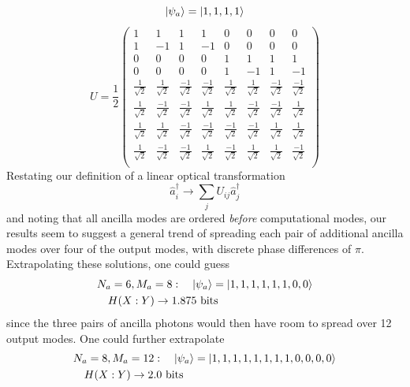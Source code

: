 \documentclass[aps,pra,twocolumn,showpacs,superscriptaddress,floatfix,10pt]{revtex4}
\begin{document}
		\newline
		$$ \ket{\psi_a} = \ket{1,1,1,1} $$
		\newline
		\begin{equation}
		\label{1111 Ancilla}
		U = \frac{1}{2} \begin{pmatrix} 
		1 & 1 & 1 & 1 & 0 & 0 & 0 & 0 \\ 
		1 & -1 & 1 & -1 & 0 & 0 & 0 & 0 \\ 
		0 & 0 & 0 & 0 & 1 & 1 & 1 & 1 \\
		0 & 0 & 0 & 0 & 1 & -1 & 1 & -1 \\
		\frac{1}{\sqrt 2} & \frac{1}{\sqrt 2} & \frac{-1}{\sqrt 2} & \frac{-1}{\sqrt 2} & \frac{1}{\sqrt 2} & \frac{1}{\sqrt 2} & \frac{-1}{\sqrt 2} & \frac{-1}{\sqrt 2} \\ 
		\frac{1}{\sqrt 2} & \frac{-1}{\sqrt 2} & \frac{-1}{\sqrt 2} & \frac{1}{\sqrt 2} & \frac{1}{\sqrt 2} & \frac{-1}{\sqrt 2} & \frac{-1}{\sqrt 2} & \frac{1}{\sqrt 2} \\ 
		\frac{1}{\sqrt 2} & \frac{1}{\sqrt 2} & \frac{-1}{\sqrt 2} & \frac{-1}{\sqrt 2} & \frac{-1}{\sqrt 2} & \frac{-1}{\sqrt 2} & \frac{1}{\sqrt 2} & \frac{1}{\sqrt 2} \\ 
		\frac{1}{\sqrt 2} & \frac{-1}{\sqrt 2} & \frac{-1}{\sqrt 2} & \frac{1}{\sqrt 2} & \frac{-1}{\sqrt 2} & \frac{1}{\sqrt 2} & \frac{1}{\sqrt 2} & \frac{-1}{\sqrt 2} \\ 
		\end{pmatrix}   
		\end{equation}
Restating our definition of a linear optical transformation
\begin{equation}
\hat{a}^\dagger_i \rightarrow \sum_j U_{i j} \hat{a}_j^\dagger
\end{equation}
and noting that all ancilla modes are ordered \textit{before} computational modes, our results seem to suggest a general trend of spreading each pair of additional ancilla modes over four of the output modes, with discrete phase differences of $\pi$. Extrapolating these solutions, one could guess
\begin{eqnarray}
&N_a = 6, M_a = 8 : \quad \ket{\psi_a} = \ket{1,1,1,1,1,1,0,0} \nonumber \\ & \quad H(X:Y) \rightarrow 1.875 \mbox{ bits} \nonumber
\end{eqnarray}
since the three pairs of ancilla photons would then have room to spread over 12 output modes. One could further extrapolate
\begin{eqnarray}
& N_a = 8, M_a = 12 : \quad \ket{\psi_a} = \ket{1,1,1,1,1,1,1,1,0,0,0,0} \nonumber \\  & \quad H(X:Y) \rightarrow 2.0 \mbox{ bits} \nonumber
\end{eqnarray}
\end{document}
